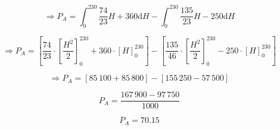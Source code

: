 \documentclass{article}
\begin{document}
\begin{description}
\begin{equation*}
\Rightarrow P_A = \int_0^{230}\! \frac{74}{23}H + 360 \mathrm{d}H - \int_0^{230}\! \frac{135}{23}H -250 \mathrm{d}H
\end{equation*}

\begin{equation*}
\Rightarrow P_A = \left[ \frac{74}{23}\cdot\left[ \frac{H^2}{2}\right]_0^{230} + 360\cdot\left[ H\right]_0^{230}\right] - \left[ \frac{135}{46}\cdot\left[ \frac{H^2}{2}\right]_0^{230} - 250\cdot\left[ H\right]_0^{230}\right]
\end{equation*}

\begin{equation*}
\Rightarrow P_A = \left[ 85\, 100+ 85\, 800\right] - \left[ 155\,250- 57\,500\right]
\end{equation*}

\begin{equation*}
P_A = \frac{167\, 900- 97\, 750}{1000}
\end{equation*}

\begin{equation*}
P_A = 70.15
\end{equation*}



\end{description}
\end{document}
